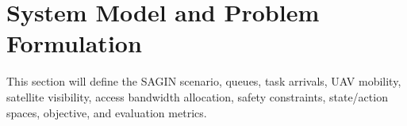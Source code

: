 \section{System Model and Problem Formulation}

This section will define the SAGIN scenario, queues, task arrivals, UAV
mobility, satellite visibility, access bandwidth allocation, safety constraints,
state/action spaces, objective, and evaluation metrics.
